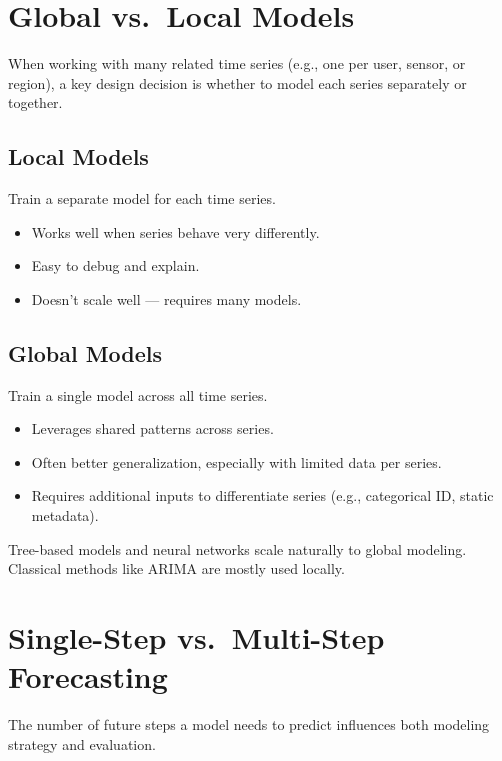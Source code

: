 \documentclass[12pt,openany]{book}
\begin{document}
\section{Global vs.\ Local Models}

When working with many related time series (e.g., one per user, sensor, or region), a key design decision is whether to model each series separately or together.


\subsection*{Local Models}

Train a separate model for each time series.

\begin{itemize}
    \item Works well when series behave very differently.
    \item Easy to debug and explain.
    \item Doesn’t scale well — requires many models.
\end{itemize}


\subsection*{Global Models}

Train a single model across all time series.

\begin{itemize}
    \item Leverages shared patterns across series.
    \item Often better generalization, especially with limited data per series.
    \item Requires additional inputs to differentiate series (e.g., categorical ID, static metadata).
\end{itemize}

\begin{notebox}
Tree-based models and neural networks scale naturally to global modeling. Classical methods like ARIMA are mostly used locally.
\end{notebox}



\section{Single-Step vs.\ Multi-Step Forecasting}

The number of future steps a model needs to predict influences both modeling strategy and evaluation.
\end{document}
